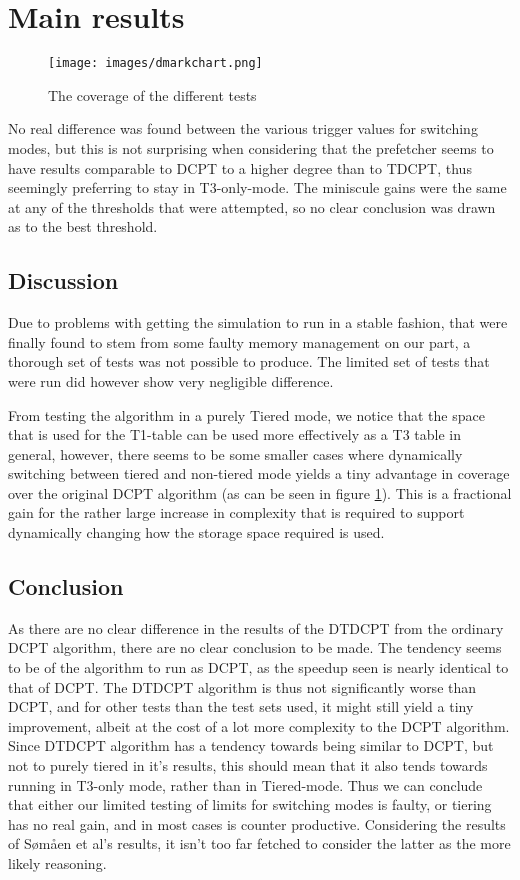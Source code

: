 \section{Main results}
\begin{figure}
\centering
\texttt{[image: images/dmarkchart.png]}
\caption{The coverage of the different tests}
\label{fig:chart}
\end{figure}
No real difference was found between the various trigger values for switching modes,
but this is not surprising when considering that the prefetcher seems to have results
comparable to DCPT to a higher degree than to TDCPT, thus seemingly preferring to stay
in T3-only-mode. The miniscule gains were the same at any of the thresholds that were
attempted, so no clear conclusion was drawn as to the best threshold.

\subsection{Discussion}
Due to problems with getting the simulation to run in a stable fashion, that
were finally found to stem from some faulty memory management on our part, a
thorough set of tests was not possible to produce. The limited set of tests
that were run did however show very negligible difference.

From testing the algorithm in a purely Tiered mode, we notice that the
space that is used for the T1-table can be used more effectively as a T3
table in general, however, there seems to be some smaller cases where dynamically
switching between tiered and non-tiered mode yields a tiny advantage in coverage
over the original DCPT algorithm (as can be seen in figure \ref{fig:chart}). 
This is a fractional gain for the rather
large increase in complexity that is required to support dynamically changing how
the storage space required is used.


\subsection{Conclusion}
As there are no clear difference in the results of the DTDCPT from the ordinary
DCPT algorithm, there are no clear conclusion to be made. The tendency seems to
be of the algorithm to run as DCPT, as the speedup seen is nearly identical to
that of DCPT. The DTDCPT algorithm is thus not significantly worse than DCPT, and for other
tests than the test sets used, it might still yield a tiny improvement, albeit at the cost
of a lot more complexity to the DCPT algorithm. Since DTDCPT algorithm has a tendency towards
being similar to DCPT, but not to purely tiered in it's results, this should mean that it also
tends towards running in T3-only mode, rather than in Tiered-mode. Thus we can conclude that either
our limited testing of limits for switching modes is faulty, or tiering has no real gain, and in most
cases is counter productive. Considering the results of Sømåen et al's results, it isn't too far fetched
to consider the latter as the more likely reasoning.

